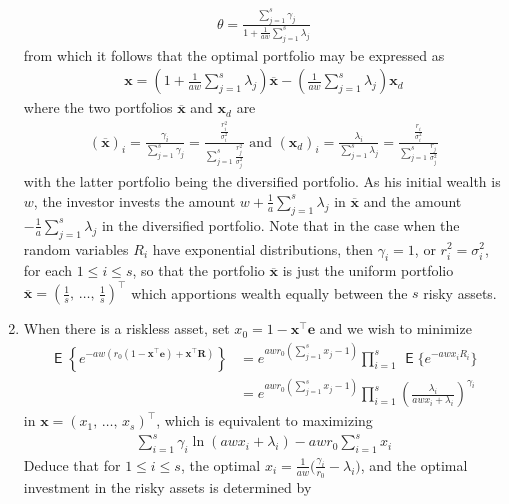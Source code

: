 \documentclass[10pt,handout]{beamer}
\newcommand{\ds}{\displaystyle}
\DeclareMathOperator\expc{\mathsf{E}}
\theoremstyle{definition}
\begin{document}
\begin{frame}[allowframebreaks]
\begin{enumerate}
\begin{align*}
      \theta = \frac{\sum_{j=1}^s \gamma_j}{1 + \frac{1}{aw}\sum_{j=1}^s \lambda_j}
    \end{align*}
    from which it follows that the optimal portfolio may be expressed as
    \begin{align*}
      \mathbf{x} = \left(1 + \frac{1}{aw}\sum_{j=1}^s \lambda_j\right)\overline{\mathbf{x}} - \left(\frac{1}{aw}\sum_{j=1}^s \lambda_j\right)\mathbf{x}_d
    \end{align*}
    where the two portfolios $\overline{\mathbf{x}}$ and $\mathbf{x}_d$ are
    \begin{align*}
      (\overline{\mathbf{x}})_i = \frac{\gamma_i}{\sum_{j = 1}^s\gamma_j} = \frac{\frac{r_i^2}{\sigma_i^2}}{\sum_{j = 1}^s \frac{r_j^2}{\sigma_j^2}} \text{ and } (\mathbf{x}_d)_i = \frac{\lambda_i}{\sum_{j = 1}^s\lambda_j} = \frac{\frac{r_i}{\sigma_i^2}}{\sum_{j = 1}^s\frac{r_j}{\sigma_j^2}}
    \end{align*}
    with the latter portfolio being the diversified portfolio. As his initial wealth is $w$, the investor invests the amount $\ds w + \frac{1}{a}\sum_{j = 1}^s\lambda_j$ in $\overline{\mathbf{x}}$ and the amount $\ds-\frac{1}{a}\sum_{j = 1}^s\lambda_j$ in the diversified portfolio. Note that in the case when the random variables $R_i$ have exponential distributions, then $\gamma_i = 1$, or $r_i^2 = \sigma_i^2$, for each $1 \leqslant i \leqslant s$, so that the portfolio $\overline{\mathbf{x}}$ is just the uniform portfolio $\ds\overline{\mathbf{x}} = \left(\frac{1}{s},\,\ldots,\,\frac{1}{s}\right)^\top$ which apportions wealth equally between the $s$ risky assets.
    \item When there is a riskless asset, set $x_0 = 1 - \mathbf{x}^\top\mathbf{e}$ and we wish to minimize
      \begin{align*}
        \expc\left\{e^{-aw(r_0(1-\mathbf{x}^\top\mathbf{e})+\mathbf{x}^\top\mathbf{R})}\right\} &= e^{awr_0(\sum_{j = 1}^s x_j-1)} \prod_{i = 1}^s\,\expc\big\{e^{-awx_i R_i}\big\} \\ &= e^{awr_0(\sum_{j = 1}^s x_j-1)} \prod_{i = 1}^s \left(\frac{\lambda_i}{awx_i + \lambda_i}\right)^{\gamma_i}
      \end{align*}
      in $\mathbf{x} = \left(x_1,\,\ldots,\,x_s\right)^\top$, which is equivalent to maximizing
      \begin{align*}
        \sum_{i=1}^s \gamma_i\ln(awx_i + \lambda_i) - awr_0\sum_{i=1}^s x_i
      \end{align*}
      Deduce that for $1 \leqslant i \leqslant s$, the optimal $\ds x_i = \frac{1}{aw}\Big(\frac{\gamma_i}{r_0} - \lambda_i\Big)$, and the optimal investment in the risky assets is determined by

\end{enumerate}
\end{frame}
\end{document}
